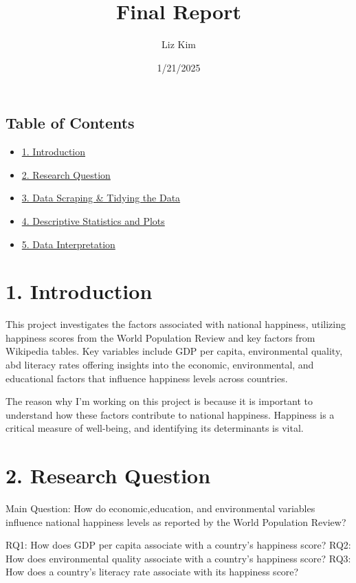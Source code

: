 \documentclass[
]{article}
\title{Final Report}
\author{Liz Kim}
\date{1/21/2025}
\providecommand{\tightlist}{%
  \setlength{\itemsep}{0pt}\setlength{\parskip}{0pt}}
\begin{document}
\maketitle

\subsection{Table of Contents}\label{table-of-contents}

\begin{itemize}
\tightlist
\item
  \hyperref[introduction]{1. Introduction}
\item
  \hyperref[research-question]{2. Research Question}
\item
  \hyperref[Data-Scaping-and-Tidying-the-Data]{3. Data Scraping \&
  Tidying the Data}
\item
  \hyperref[descriptive-statistics-and-plots]{4. Descriptive Statistics
  and Plots}
\item
  \hyperref[data-interpretation]{5. Data Interpretation}
\end{itemize}

\section{1. Introduction}\label{introduction}

This project investigates the factors associated with national
happiness, utilizing happiness scores from the World Population Review
and key factors from Wikipedia tables. Key variables include GDP per
capita, environmental quality, abd literacy rates offering insights into
the economic, environmental, and educational factors that influence
happiness levels across countries.

The reason why I'm working on this project is because it is important to
understand how these factors contribute to national happiness. Happiness
is a critical measure of well-being, and identifying its determinants is
vital.

\section{2. Research Question}\label{research-question}

Main Question: How do economic,education, and environmental variables
influence national happiness levels as reported by the World Population
Review?

RQ1: How does GDP per capita associate with a country's happiness score?
RQ2: How does environmental quality associate with a country's happiness
score? RQ3: How does a country's literacy rate associate with its
happiness score?
\end{document}
